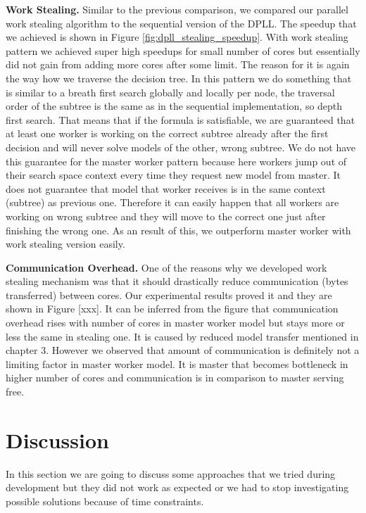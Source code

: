 \documentclass[letterpaper]{article}
\newcommand{\mypar}[1]{{\bf #1.}}
\begin{document}
\mypar{Work Stealing}
Similar to the previous comparison, we compared our parallel work stealing algorithm to the sequential version of the DPLL.
The speedup that we achieved is shown in Figure \ref{fig:dpll_stealing_speedup}.
With work stealing pattern we achieved super high speedups for small number of cores but essentially did not gain from adding more cores after some limit.
The reason for it is again the way how we traverse the decision tree.
In this pattern we do something that is similar to a breath first search globally and locally per node, the traversal order of the subtree is the same as in the sequential implementation, so depth first search.
That means that if the formula is satisfiable, we are guaranteed that at least one worker is working on the correct subtree already after the first decision and will never solve models of the other, wrong subtree.
We do not have this guarantee for the master worker pattern because here workers jump out of their search space context every time they request new model from master. It does not guarantee that model that worker receives is in the same context (subtree) as previous one. Therefore it can easily happen that all workers are working on wrong subtree and they will move to the correct one just after finishing the wrong one. As an result of this, we outperform master worker with work stealing version easily.

\mypar{Communication Overhead} One of the reasons why we developed work stealing mechanism was that it should drastically reduce communication (bytes transferred) between cores. Our experimental results proved it and they are shown in Figure [xxx]. It can be inferred from the figure that communication overhead rises with number of cores in master worker model but stays more or less the same in stealing one. It is caused by reduced model transfer mentioned in chapter 3. However we observed that amount of communication is definitely not a limiting factor in master worker model. It is master that becomes bottleneck in higher number of cores and communication is in comparison to master serving free.

\section{Discussion}
In this section we are going to discuss some approaches that we tried during development but they did not work as expected or we had to stop investigating possible solutions because of time constraints.
\end{document}
